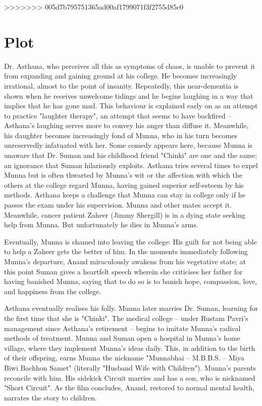 \documentclass[]{article}
\begin{document}
>>>>>>> 005d7b795751365ad00af1799071f3f2755d85c0
	\section{Plot}
	Dr. Asthana, who perceives all this as symptoms of chaos, is unable to prevent it from expanding and gaining ground at his college. He becomes increasingly irrational, almost to the point of insanity. Repeatedly, this near-dementia is shown when he receives unwelcome tidings and he begins laughing in a way that implies that he has gone mad. This behaviour is explained early on as an attempt to practice "laughter therapy", an attempt that seems to have backfired – Asthana's laughing serves more to convey his anger than diffuse it. Meanwhile, his daughter becomes increasingly fond of Munna, who in his turn becomes unreservedly infatuated with her. Some comedy appears here, because Munna is unaware that Dr. Suman and his childhood friend "Chinki" are one and the same; an ignorance that Suman hilariously exploits. Asthana tries several times to expel Munna but is often thwarted by Munna's wit or the affection with which the others at the college regard Munna, having gained superior self-esteem by his methods. Asthana keeps a challenge that Munna can stay in college only if he passes the exam under his supervision. Munna and other mates accept it. Meanwhile, cancer patient Zaheer (Jimmy Shergill) is in a dying state seeking help from Munna. But unfortunately he dies in Munna's arms.

Eventually, Munna is shamed into leaving the college: His guilt for not being able to help a Zaheer gets the better of him. In the moments immediately following Munna's departure, Anand miraculously awakens from his vegetative state; at this point Suman gives a heartfelt speech wherein she criticises her father for having banished Munna, saying that to do so is to banish hope, compassion, love, and happiness from the college.

Asthana eventually realises his folly. Munna later marries Dr. Suman, learning for the first time that she is "Chinki". The medical college – under Rustam Pavri's management since Asthana's retirement – begins to imitate Munna's radical methods of treatment. Munna and Suman open a hospital in Munna's home village, where they implement Munna's ideas daily. This, in addition to the birth of their offspring, earns Munna the nickname "Munnabhai – M.B.B.S. – Miya Biwi Bachhon Samet" (literally "Husband Wife with Children"). Munna's parents reconcile with him. His sidekick Circuit marries and has a son, who is nicknamed "Short Circuit". As the film concludes, Anand, restored to normal mental health, narrates the story to children.
\end{document}
